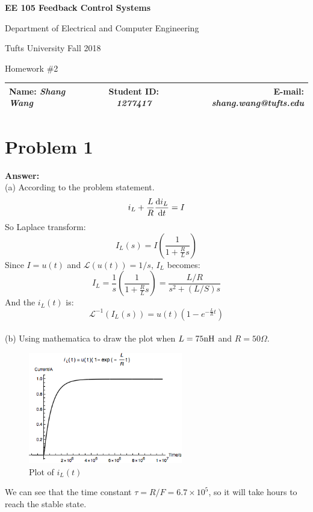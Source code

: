 \documentclass[a4paper]{article}
\begin{document}
\begin{center}
\bf\Large
EE 105 Feedback Control Systems\par
Department of Electrical and Computer Engineering\par
Tufts University Fall 2018\par
Homework \#2\par   
\end{center}
\begin{table}[H]
\begin{center}
\begin{tabular*}{\textwidth}{@{\extracolsep{\fill}}lcr}
Name: {\it Shang Wang} &Student ID: {\it 1277417} &E-mail: {\it shang.wang@tufts.edu}\\
\hline
\end{tabular*}
\end{center}
\end{table}

\section{Problem 1}
{\bf Answer: }\\
(a) According to the problem statement.\\
$$
i_L + \frac{L}{R} \frac{{\rm d} i_L}{{\rm d}t} = I
$$
So Laplace transform:
$$
I_L(s) = I(\frac{1}{1+\frac RL s}) 
$$
Since $I = u(t)$ and $\mathcal{L} (u(t)) = 1/s$, $I_L$ becomes:
$$
I_L = \frac{1}{s}(\frac{1}{1+\frac RL s}) = \frac{L/R}{s^2 + (L/S) s}
$$
And the $i_L(t)$ is:
$$
\mathcal{L}^{-1}(I_L(s)) = u(t)(1-e^{-\frac LR t})
$$\\
(b) Using mathematica to draw the plot when $L = 75 \rm nH$ and $R = 50 \Omega$.
\begin{figure}[hbtp]
\centering
\includegraphics[width=0.6\textwidth]{pic/iLt.png}
\caption{Plot of $i_L(t)$} 
\label{iLt}
\end{figure}
We can see that the time constant $\tau = R/F = 6.7\times 10 ^{5}$, so it will take hours to reach the stable state.
\end{document}
